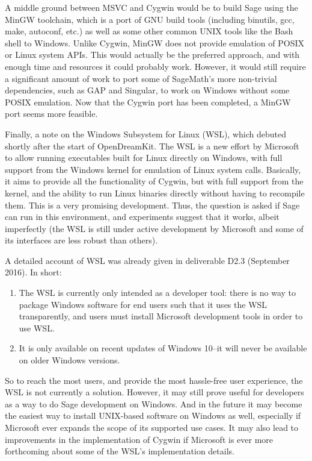 A middle ground between MSVC and Cygwin would be to build Sage using the
MinGW toolchain, which is a port of GNU build tools (including binutils,
gcc, make, autoconf, etc.) as well as some other common UNIX tools like
the Bash shell to Windows. Unlike Cygwin, MinGW does not provide
emulation of POSIX or Linux system APIs. This would actually be the
preferred approach, and with enough time and resources it could probably
work. However, it would still require a significant amount of work to
port some of SageMath's more non-trivial dependencies, such as GAP and
Singular, to work on Windows without some POSIX emulation. Now that the
Cygwin port has been completed, a MinGW port seems more feasible.

Finally, a note on the Windows Subsystem for Linux (WSL), which debuted shortly
after the start of OpenDreamKit. The WSL is a new effort by Microsoft to allow
running executables built for Linux directly on Windows, with full support from
the Windows kernel for emulation of Linux system calls. Basically, it aims to
provide all the functionality of Cygwin, but with full support from the kernel,
and the ability to run Linux binaries directly without having to recompile
them. This is a very promising development. Thus, the question is asked if Sage
can run in this environment, and experiments suggest that it works, albeit
imperfectly (the WSL is still under active development by Microsoft and some of
its interfaces are less robust than others).

A detailed account of WSL was already given in deliverable D2.3
(September 2016). In short:
\begin{enumerate}
\def\labelenumi{\arabic{enumi})}
\item The WSL is currently only intended as a developer tool: there is no way
    to package Windows software for end users such that it uses the WSL
    transparently, and users must install Microsoft development tools in order
    to use WSL.

\item It is only available on recent updates of Windows 10--it will never be
    available on older Windows versions.
\end{enumerate}

So to reach the most users, and provide the most hassle-free user experience,
the WSL is not currently a solution.  However, it may still prove useful for
developers as a way to do Sage development on Windows. And in the future it may
become the easiest way to install UNIX-based software on Windows as well,
especially if Microsoft ever expands the scope of its supported use cases. It
may also lead to improvements in the implementation of Cygwin if Microsoft is
ever more forthcoming about some of the WSL's implementation details.

